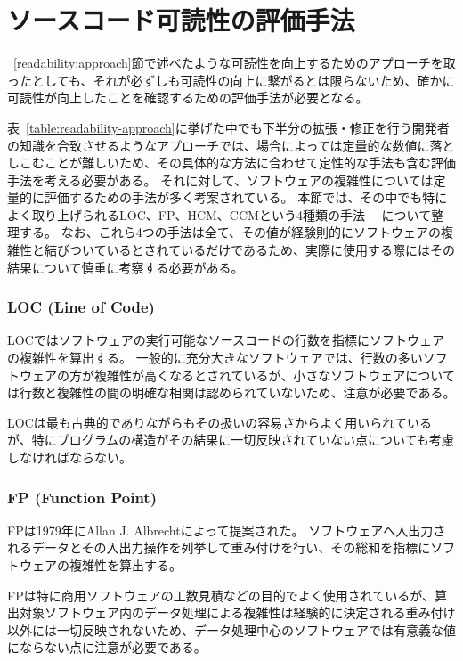 \section{ソースコード可読性の評価手法}
\label{readability:evaluation}

~\ref{readability:approach}節で述べたような可読性を向上するためのアプローチを取ったとしても、それが必ずしも可読性の向上に繋がるとは限らないため、確かに可読性が向上したことを確認するための評価手法が必要となる。

表~\ref{table:readability-approach}に挙げた中でも下半分の拡張・修正を行う開発者の知識を合致させるようなアプローチでは、場合によっては定量的な数値に落としこむことが難しいため、その具体的な方法に合わせて定性的な手法も含む評価手法を考える必要がある。
それに対して、ソフトウェアの複雑性については定量的に評価するための手法が多く考案されている。
本節では、その中でも特によく取り上げられるLOC、FP、HCM、CCMという4種類の手法~\cite{yu} ~\cite{symons}について整理する。
なお、これら4つの手法は全て、その値が経験則的にソフトウェアの複雑性と結びついているとされているだけであるため、実際に使用する際にはその結果について慎重に考察する必要がある。

\subsubsection{LOC (Line of Code)}

LOCではソフトウェアの実行可能なソースコードの行数を指標にソフトウェアの複雑性を算出する。
一般的に充分大きなソフトウェアでは、行数の多いソフトウェアの方が複雑性が高くなるとされているが、小さなソフトウェアについては行数と複雑性の間の明確な相関は認められていないため、注意が必要である。

LOCは最も古典的でありながらもその扱いの容易さからよく用いられているが、特にプログラムの構造がその結果に一切反映されていない点についても考慮しなければならない。

\subsubsection{FP (Function Point)}

FPは1979年にAllan J. Albrechtによって提案された。
ソフトウェアへ入出力されるデータとその入出力操作を列挙して重み付けを行い、その総和を指標にソフトウェアの複雑性を算出する。

FPは特に商用ソフトウェアの工数見積などの目的でよく使用されているが、算出対象ソフトウェア内のデータ処理による複雑性は経験的に決定される重み付け以外には一切反映されないため、データ処理中心のソフトウェアでは有意義な値にならない点に注意が必要である。

